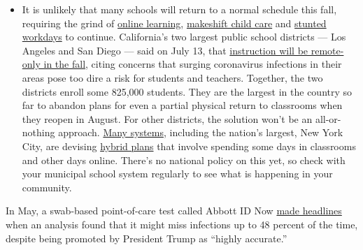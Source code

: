 \begin{itemize}
  \begin{itemize}
  \tightlist
  \item
    It is unlikely that many schools will return to a normal schedule
    this fall, requiring the grind of
    \href{https://www.nytimes.com/2020/06/05/us/coronavirus-education-lost-learning.html?action=click\&pgtype=Article\&state=default\&region=MAIN_CONTENT_3\&context=storylines_faq}{online
    learning},
    \href{https://www.nytimes.com/2020/05/29/us/coronavirus-child-care-centers.html?action=click\&pgtype=Article\&state=default\&region=MAIN_CONTENT_3\&context=storylines_faq}{makeshift
    child care} and
    \href{https://www.nytimes.com/2020/06/03/business/economy/coronavirus-working-women.html?action=click\&pgtype=Article\&state=default\&region=MAIN_CONTENT_3\&context=storylines_faq}{stunted
    workdays} to continue. California's two largest public school
    districts --- Los Angeles and San Diego --- said on July 13, that
    \href{https://www.nytimes.com/2020/07/13/us/lausd-san-diego-school-reopening.html?action=click\&pgtype=Article\&state=default\&region=MAIN_CONTENT_3\&context=storylines_faq}{instruction
    will be remote-only in the fall}, citing concerns that surging
    coronavirus infections in their areas pose too dire a risk for
    students and teachers. Together, the two districts enroll some
    825,000 students. They are the largest in the country so far to
    abandon plans for even a partial physical return to classrooms when
    they reopen in August. For other districts, the solution won't be an
    all-or-nothing approach.
    \href{https://bioethics.jhu.edu/research-and-outreach/projects/eschool-initiative/school-policy-tracker/}{Many
    systems}, including the nation's largest, New York City, are
    devising
    \href{https://www.nytimes.com/2020/06/26/us/coronavirus-schools-reopen-fall.html?action=click\&pgtype=Article\&state=default\&region=MAIN_CONTENT_3\&context=storylines_faq}{hybrid
    plans} that involve spending some days in classrooms and other days
    online. There's no national policy on this yet, so check with your
    municipal school system regularly to see what is happening in your
    community.
  \end{itemize}
\end{itemize}

In May, a swab-based point-of-care test called Abbott ID Now
\href{https://www.nytimes.com/interactive/2020/05/12/us/coronavirus-testing-white-house.html}{made
headlines} when an analysis found that it might miss infections up to 48
percent of the time, despite being promoted by President Trump as
``highly accurate.''

